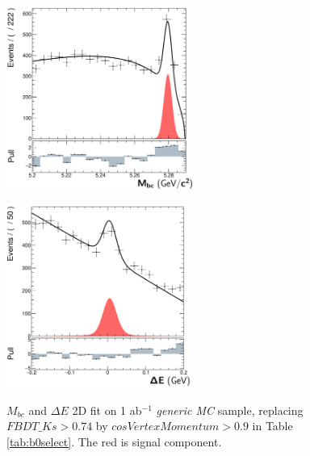 \begin{figure}[htbp]
	\begin{minipage}[b]{0.5\linewidth}
		\centering 
		\includegraphics[height=6cm]{figures/ds_gen_mbc_2D}
		\label{}
	\end{minipage}
	\begin{minipage}[b]{0.5\linewidth}
		\centering 
		\includegraphics[height=6cm]{figures/ds_gen_deltaE_2D}
		\label{}
	\end{minipage}
	\caption{$M_{bc}$ and $\Delta E$ 2D fit on 1 ab$^{-1}$ \textit{generic MC} sample, replacing $FBDT\_Ks>0.74$ by ${cosVertexMomentum}>0.9$ in Table \ref{tab:b0select}. The red is signal component.}
	\label{fig:2Ddata_noks}
\end{figure}

